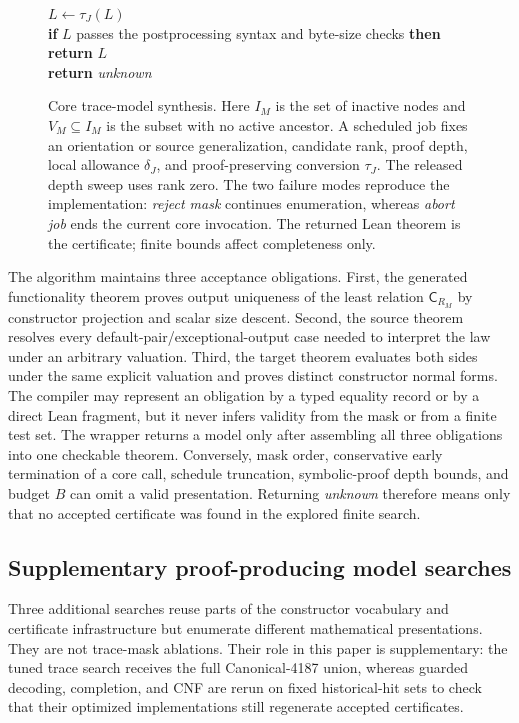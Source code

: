 \documentclass[runningheads]{llncs}
\newcommand{\Code}{\mathsf{C}}
\begin{document}
\begin{figure}[!t]
\begin{minipage}{0.93\linewidth}
\qquad $L\leftarrow\tau_J(L)$\\
\qquad \textbf{if} $L$ passes the postprocessing syntax and byte-size checks
      \textbf{then return} $L$\\
\quad \textbf{return} \emph{unknown}
\end{minipage}
\caption{Core trace-model synthesis.  Here $I_M$ is the set of inactive nodes
and $V_M\subseteq I_M$ is the subset with no active ancestor.  A scheduled job
fixes an orientation or source generalization, candidate rank, proof depth,
local allowance $\delta_J$, and proof-preserving conversion $\tau_J$.  The
released depth sweep uses rank zero.  The two failure modes reproduce the
implementation: \emph{reject mask} continues enumeration, whereas
\emph{abort job} ends the current core invocation.  The returned Lean theorem
is the certificate; finite bounds affect completeness only.}
\label{fig:trace-algorithm}
\end{figure}

The algorithm maintains three acceptance obligations.  First, the generated
functionality theorem proves output uniqueness of the least relation
$\Code_{R_M}$ by constructor projection and scalar size descent.  Second, the
source theorem resolves every default-pair/exceptional-output case needed to interpret the law under
an arbitrary valuation.  Third, the target theorem evaluates both sides under
the same explicit valuation and proves distinct constructor normal forms.
The compiler may represent an obligation by a typed equality record or by a
direct Lean fragment, but it never infers validity from the mask or from a
finite test set.  The wrapper returns a model only after assembling all three
obligations into one checkable theorem.  Conversely, mask order, conservative
early termination of a core call, schedule truncation, symbolic-proof depth bounds,
and budget $B$ can omit
a valid presentation.  Returning \emph{unknown} therefore means only that no
accepted certificate was found in the explored finite search.

\subsection{Supplementary proof-producing model searches}
\label{sec:related-searches}

Three additional searches reuse parts of the constructor vocabulary and
certificate infrastructure but enumerate different mathematical
presentations.  They are not trace-mask ablations.  Their role in this paper is
supplementary: the tuned trace search receives the full Canonical-4187 union, whereas
guarded decoding, completion, and CNF are rerun on fixed historical-hit sets to
check that their optimized implementations still regenerate accepted
certificates.
\end{document}
